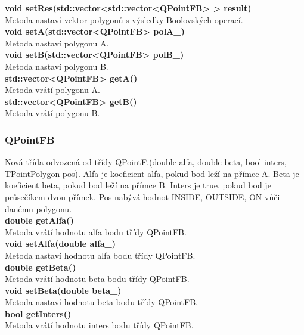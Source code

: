 \documentclass[a4paper, 12pt]{article}
\begin{document}
\textbf{void setRes(std::vector<std::vector<QPointFB> > result)}\\
Metoda nastaví vektor polygonů s výsledky Boolovských operací.\\

\textbf{void setA(std::vector<QPointFB> polA_)}\\
Metoda nastaví polygonu A.\\

\textbf{void setB(std::vector<QPointFB> polB_)}\\
Metoda nastaví polygonu B.\\

\textbf{std::vector<QPointFB> getA()}\\
Metoda vrátí polygonu A.\\

\textbf{std::vector<QPointFB> getB()}\\
Metoda vrátí polygonu B.\\


\subsubsection{QPointFB}
Nová třída odvozená od třídy QPointF.(double alfa, double beta, bool inters, TPointPolygon pos). Alfa je koeficient alfa, pokud bod leží na přímce A. 
Beta je koeficient beta, pokud bod leží na přímce B. Inters je true, pokud bod je průsečíkem dvou přímek. Pos nabývá hodnot INSIDE, OUTSIDE, ON vůči danému polygonu.\\

\textbf{double getAlfa()}\\
Metoda vrátí hodnotu alfa bodu třídy QPointFB.\\

\textbf{void setAlfa(double alfa_)}\\
Metoda nastaví hodnotu alfa bodu třídy QPointFB.\\

\textbf{double getBeta()}\\
Metoda vrátí hodnotu beta bodu třídy QPointFB.\\

\textbf{void setBeta(double beta_)}\\
Metoda nastaví hodnotu beta bodu třídy QPointFB.\\

\textbf{bool getInters()}\\
Metoda vrátí hodnotu inters bodu třídy QPointFB.\\
\end{document}
